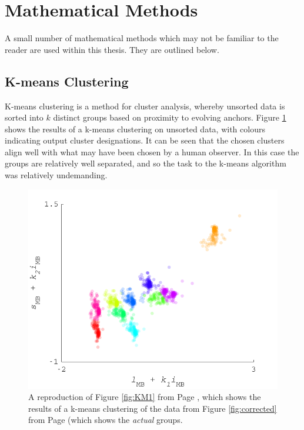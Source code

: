 \section{Mathematical Methods}

A small number of mathematical methods which may not be familiar to the reader are used within this thesis. They are outlined below.

\subsection{K-means Clustering}

K-means clustering is a method for cluster analysis, whereby unsorted data is sorted into $k$ distinct groups based on proximity to evolving anchors. Figure \ref{fig:KM1lr} shows the results of a k-means clustering on unsorted data, with colours indicating output cluster designations. It can be seen that the chosen clusters align well with what may have been chosen by a human observer. In this case the groups are relatively well separated, and so the task to the k-means algorithm was relatively undemanding.

\begin{figure}[htbp]
 \includegraphics[max width=\textwidth]{figs/comp/KMeansMarkDemo/1.pdf}
 \caption{A reproduction of Figure \ref{fig:KM1} from Page \pageref{fig:KM1}, which shows the results of a k-means clustering of the data from Figure \ref{fig:corrected} from Page \pageref{fig:corrected} (which shows the \emph{actual} groups.}
 \label{fig:KM1lr}
\end{figure} 

